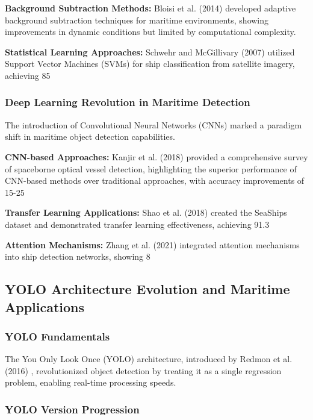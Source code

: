 \documentclass[a4paper,11pt]{article}
\begin{document}
\textbf{Background Subtraction Methods:} Bloisi et al. (2014) \cite{bloisi2014background} developed adaptive background subtraction techniques for maritime environments, showing improvements in dynamic conditions but limited by computational complexity.

\textbf{Statistical Learning Approaches:} Schwehr and McGillivary (2007) \cite{schwehr2007marine} utilized Support Vector Machines (SVMs) for ship classification from satellite imagery, achieving 85%

\subsubsection{Deep Learning Revolution in Maritime Detection}
The introduction of Convolutional Neural Networks (CNNs) marked a paradigm shift in maritime object detection capabilities.

\textbf{CNN-based Approaches:} Kanjir et al. (2018) \cite{kanjir2018vessel} provided a comprehensive survey of spaceborne optical vessel detection, highlighting the superior performance of CNN-based methods over traditional approaches, with accuracy improvements of 15-25%

\textbf{Transfer Learning Applications:} Shao et al. (2018) \cite{shao2018seaships} created the SeaShips dataset and demonstrated transfer learning effectiveness, achieving 91.3%

\textbf{Attention Mechanisms:} Zhang et al. (2021) \cite{zhang2021attention} integrated attention mechanisms into ship detection networks, showing 8%

\subsection{YOLO Architecture Evolution and Maritime Applications}

\subsubsection{YOLO Fundamentals}
The You Only Look Once (YOLO) architecture, introduced by Redmon et al. (2016) \cite{yolo_original}, revolutionized object detection by treating it as a single regression problem, enabling real-time processing speeds.

\subsubsection{YOLO Version Progression}
\end{document}
